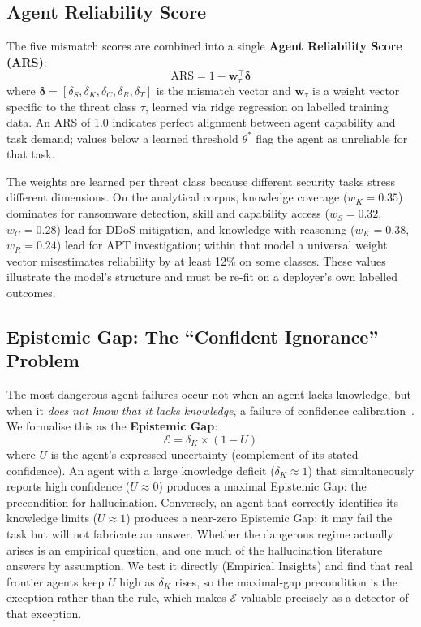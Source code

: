 \subsection{Agent Reliability Score}

The five mismatch scores are combined into a single
\textbf{Agent Reliability Score (ARS)}:
\[
  \mathrm{ARS} = 1 - \mathbf{w}_\tau^\top \boldsymbol{\delta}
\]
where $\boldsymbol{\delta} = [\delta_S, \delta_K, \delta_C, \delta_R,
\delta_T]$ is the mismatch vector and $\mathbf{w}_\tau$ is a weight vector
specific to the threat class $\tau$, learned via ridge regression on labelled
training data. An ARS of 1.0 indicates perfect alignment between agent
capability and task demand; values below a learned threshold $\theta^*$
flag the agent as unreliable for that task.

The weights are learned per threat class because different security tasks
stress different dimensions. On the analytical corpus, knowledge coverage
($w_K = 0.35$) dominates for ransomware detection, skill and capability
access ($w_S = 0.32$, $w_C = 0.28$) lead for DDoS mitigation, and knowledge
with reasoning ($w_K = 0.38$, $w_R = 0.24$) lead for APT investigation;
within that model a universal weight vector misestimates reliability by at
least 12\% on some classes. These values illustrate the model's structure
and must be re-fit on a deployer's own labelled outcomes.

\subsection{Epistemic Gap: The ``Confident Ignorance'' Problem}

The most dangerous agent failures occur not when an agent lacks knowledge,
but when it \textit{does not know that it lacks knowledge}, a failure of
confidence calibration~\cite{guo2017calibration}. We formalise this as the
\textbf{Epistemic Gap}:
\[
  \mathcal{E} = \delta_K \times (1 - U)
\]
where $U$ is the agent's expressed uncertainty (complement of its stated
confidence). An agent with a large knowledge deficit ($\delta_K \approx 1$)
that simultaneously reports high confidence ($U \approx 0$) produces a
maximal Epistemic Gap: the precondition for hallucination. Conversely, an
agent that correctly identifies its knowledge limits ($U \approx 1$) produces
a near-zero Epistemic Gap: it may fail the task but will not fabricate
an answer. Whether the dangerous regime actually arises is an empirical
question, and one much of the hallucination literature answers by
assumption. We test it directly (Empirical Insights) and find that real
frontier agents keep $U$ high as $\delta_K$ rises, so the maximal-gap
precondition is the exception rather than the rule, which makes
$\mathcal{E}$ valuable precisely as a detector of that exception.


